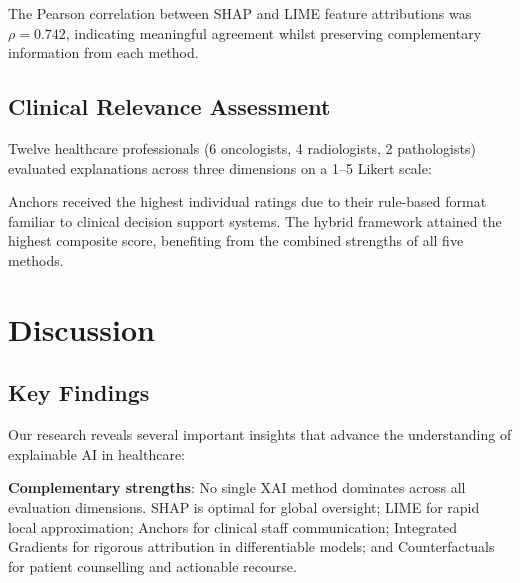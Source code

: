 \documentclass[journal]{IEEEtran}
\begin{document}
The Pearson correlation between SHAP and LIME feature attributions was $\rho = 0.742$, indicating meaningful agreement whilst preserving complementary information from each method.

\subsection{Clinical Relevance Assessment}

Twelve healthcare professionals (6 oncologists, 4 radiologists, 2 pathologists) evaluated explanations across three dimensions on a 1--5 Likert scale:

\begin{table}[htbp]
\centering
\caption{Clinical Relevance Ratings by Method (mean, $n=12$ raters)}
\label{tab:clinical}
\end{table}

Anchors received the highest individual ratings due to their rule-based format familiar to clinical decision support systems. The hybrid framework attained the highest composite score, benefiting from the combined strengths of all five methods.

\section{Discussion}

\subsection{Key Findings}

Our research reveals several important insights that advance the understanding of explainable AI in healthcare:

\textbf{Complementary strengths}: No single XAI method dominates across all evaluation dimensions. SHAP is optimal for global oversight; LIME for rapid local approximation; Anchors for clinical staff communication; Integrated Gradients for rigorous attribution in differentiable models; and Counterfactuals for patient counselling and actionable recourse.
\end{document}
